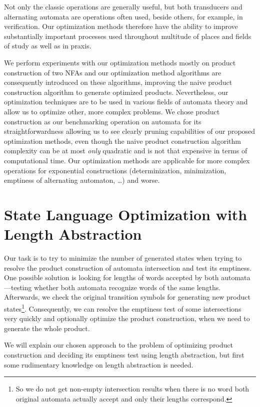 Not only the classic operations are generally useful, but both transducers and alternating automata are operations often used, beside others, for example, in verification. Our optimization methods therefore have the ability to improve substantially important processes used throughout multitude of places and fields of study as well as in praxis.

We perform experiments with our optimization methods mostly on product construction of two NFAs and our optimization method algorithms are consequently introduced on these algorithms, improving the naive product construction algorithm to generate optimized products. Nevertheless, our optimization techniques are to be used in various fields of automata theory and allow us to optimize other, more complex problems. We chose product construction as our benchmarking operation on automata for its straightforwardness allowing us to see clearly pruning capabilities of our proposed optimization methods, even though the naive product construction algorithm complexity can be at most \emph{only} quadratic and is not that expensive in terms of computational time. Our optimization methods are applicable for more complex operations for exponential constructions (determinization, minimization, emptiness of alternating automaton, \ldots) and worse.


\section{State Language Optimization with Length Abstraction}

Our task is to try to minimize the number of generated states when trying to resolve the product construction of automata intersection and test its emptiness. One possible solution is looking for lengths of words accepted by both automata---testing whether both automata recognize words of the same lengths. Afterwards, we check the original transition symbols for generating new product states\footnote{So we do not get non-empty intersection results when there is no word both original automata actually accept and only their lengths correspond.}. Consequently, we can resolve the emptiness test of some intersections very quickly and optionally optimize the product construction, when we need to generate the whole product.

We will explain our chosen approach to the problem of optimizing product construction and deciding its emptiness test using length abstraction, but first some rudimentary knowledge on length abstraction is needed.

